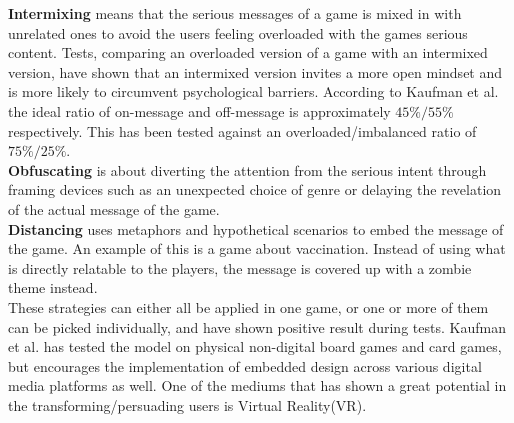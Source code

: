     \textbf{Intermixing} means that the serious messages of a game is mixed in with unrelated ones to avoid the users feeling overloaded with the games serious content\cite{embeddedDesignModel}. Tests, comparing an overloaded version of a game with an intermixed version, have shown that an intermixed version invites a more open mindset and is more likely to circumvent psychological barriers\cite{embeddedDesignModel}. According to Kaufman et al. the ideal ratio of on-message and off-message is approximately $45\%/55\%$ respectively. This has been tested against an overloaded/imbalanced ratio of $75\%/25\%$\cite{embeddedDesignModel, embeddedDesignModelTestDetails}.\\
    
    \textbf{Obfuscating} is about diverting the attention from the serious intent through framing devices such as an unexpected choice of genre or delaying the revelation of the actual message of the game\cite{embeddedDesignModel}.\\
    
    \textbf{Distancing} uses metaphors and hypothetical scenarios to embed the message of the game. An example of this is a game about vaccination. Instead of using what is directly relatable to the players, the message is covered up with a zombie theme instead\cite{embeddedDesignModel}.\\
    
    These strategies can either all be applied in one game, or one or more of them can be picked individually, and have shown positive result during tests\cite{embeddedDesignModel, embeddedDesignModelTestDetails}. Kaufman et al. has tested the model on physical non-digital board games and card games, but encourages the implementation of embedded design across various digital media platforms as well\cite{embeddedDesignModel}. One of the mediums that has shown a great potential in the transforming/persuading users is Virtual Reality(VR)\cite{persuasiveGameplay, vrCapabilitiesSlater}.
    
